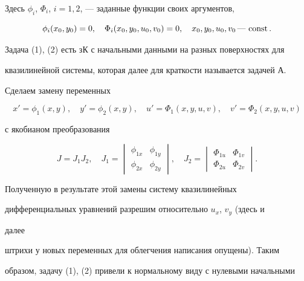 Здесь $\phi_i$, $\Phi_i$, $i=1,2$, --- заданные функции своих аргументов,


$$


\phi_i(x_0,y_0)=0,\quad \Phi_i(x_0,y_0,u_0,v_0)=0,\quad


x_0,y_0,u_0,v_0\text{\,---\,}\const.


$$





Задача (1), (2) есть зК с начальными данными на разных поверхностях для


квазилинейной системы, которая далее для краткости называется задачей А.





Сделаем замену переменных


$$


x'=\phi_1(x,y),\quad y'=\phi_2(x,y),\quad


u'=\Phi_1(x,y,u,v),\quad v'=\Phi_2(x,y,u,v)


$$


с якобианом преобразования


$$


J=J_1J_2,\quad J_1=


\begin{vmatrix}


\phi_{1x} & \phi_{1y}\\


\phi_{2x} & \phi_{2y}


\end{vmatrix}


,\quad J_2=


\begin{vmatrix}


\Phi_{1u}& \Phi_{1v}\\


\Phi_{2u}& \Phi_{2v}


\end{vmatrix}


.


$$


Полученную в результате этой замены систему квазилинейных


дифференциальных уравнений разрешим относительно $u_x$, $v_y$ (здесь и


далее


штрихи у новых переменных для облегчения написания опущены). Таким


образом, задачу (1), (2) привели к нормальному виду с нулевыми начальными


